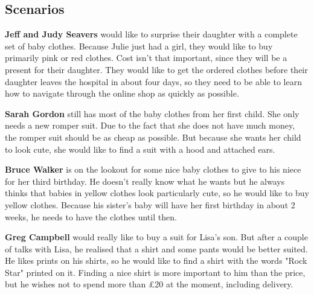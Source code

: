 \subsection{Scenarios}
\textbf{Jeff and Judy Seavers} would like to surprise their daughter with a complete set of baby clothes.
Because Julie just had a girl, they would like to buy primarily pink or red clothes. Cost isn't that important, since they will be a present for their daughter.
They would like to get the ordered clothes before their daughter leaves the hospital in about four days, so they need to be able to learn how to navigate through the online shop as quickly as possible.

\textbf{Sarah Gordon} still has most of the baby clothes from her first
child. She only needs a new romper suit.
Due to the fact that she does not have much money, the romper suit should be as cheap as possible.
But because she wants her child to look cute, she would like to find a suit with a hood and attached ears.

\textbf{Bruce Walker} is on the lookout for some nice baby clothes to give to his niece for her third birthday.
He doesn't really know what he wants but he always thinks that babies in yellow clothes look particularly cute, so he would like to buy yellow clothes.
Because his sister's baby will have her first birthday in about 2 weeks, he needs to have the clothes until then.

\textbf{Greg Campbell} would really like to buy a suit for Lisa's son. But after a couple of talks with Lisa, he realised that a shirt and some pants would be better suited.
He likes prints on his shirts, so he would like to find a shirt with the words "Rock Star" printed on it.
Finding a nice shirt is more important to him than the price, but he wishes not to spend more than \pounds20 at the moment, including delivery.